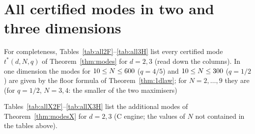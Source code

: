 \documentclass[11pt,a4paper]{article}
\theoremstyle{definition}
\theoremstyle{remark}
\begin{document}
\appendix
\section{All certified modes in two and three dimensions}\label{sec:allmodes}

For completeness, Tables~\ref{tab:all2F}--\ref{tab:all3H} list every certified mode $t^*(d,N,q)$ of Theorem~\ref{thm:modes} for $d=2,3$ (read down the columns). In one dimension the modes for $10\le N\le600$ ($q=4/5$) and $10\le N\le300$ ($q=1/2$) are given by the floor formula of Theorem~\ref{thm:1dlaw}; for $N=2,\dots,9$ they are (for $q=1/2$, $N=3,4$: the smaller of the two maximisers)


\begin{table}[!htbp]\centering\footnotesize

\caption{$d=2$, $q=4/5$: all certified modes.}\label{tab:all2F}
\end{table}
\begin{table}[!htbp]\centering\footnotesize

\caption{$d=2$, $q=1/2$: all certified modes.}\label{tab:all2H}
\end{table}
\begin{table}[!htbp]\centering\footnotesize

\caption{$d=3$, $q=4/5$: all certified modes.}\label{tab:all3F}
\end{table}
\begin{table}[!htbp]\centering\footnotesize

\caption{$d=3$, $q=1/2$: all certified modes.}\label{tab:all3H}
\end{table}

Tables~\ref{tab:allX2F}--\ref{tab:allX3H} list the additional modes of Theorem~\ref{thm:modesX} for $d=2,3$ (C engine; the values of $N$ not contained in the tables above).

\begin{table}[!htbp]\centering\footnotesize

\caption{$d=2$, $q=4/5$: the additional certified modes (Theorem~\ref{thm:modesX}).}\label{tab:allX2F}
\end{table}
\begin{table}[!htbp]\centering\footnotesize

\caption{$d=2$, $q=1/2$: the additional certified modes (Theorem~\ref{thm:modesX}).}\label{tab:allX2H}
\end{table}
\begin{table}[!htbp]\centering\footnotesize

\caption{$d=3$, $q=4/5$: the additional certified modes (Theorem~\ref{thm:modesX}).}\label{tab:allX3F}
\end{table}
\begin{table}[!htbp]\centering\footnotesize

\caption{$d=3$, $q=1/2$: the additional certified modes (Theorem~\ref{thm:modesX}).}\label{tab:allX3H}
\end{table}
\end{document}
